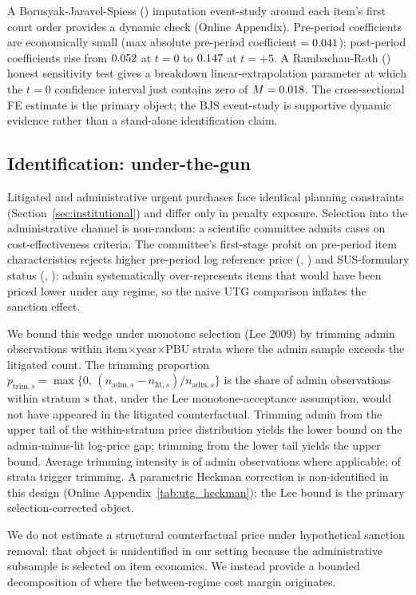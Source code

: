 A Borusyak-Jaravel-Spiess (\citeyear{borusyak2024revisiting})
imputation event-study around each item's first court order
provides a dynamic check (Online Appendix). Pre-period coefficients
are economically small (max absolute pre-period coefficient
$=0.041$); post-period coefficients rise from
$0.052$ at $t=0$ to $0.147$ at $t=+5$. A
Rambachan-Roth (\citeyear{rambachan2023more}) honest sensitivity
test gives a breakdown linear-extrapolation parameter at which the
$t=0$ confidence interval just contains zero of
$M=0.018$. The cross-sectional FE estimate is the primary
object; the BJS event-study is supportive dynamic evidence rather
than a stand-alone identification claim.

\subsection{Identification: under-the-gun}

Litigated and administrative urgent purchases face identical planning
constraints (Section~\ref{sec:institutional}) and differ only in
penalty exposure. Selection into the administrative channel is
non-random: a scientific committee admits cases on
cost-effectiveness criteria. The committee's first-stage probit on
pre-period item characteristics rejects higher pre-period log
reference price (\BPutgProbitRefPriceCoef,
\BPutgProbitRefPricePval) and SUS-formulary status
(\BPutgProbitSUSCoef, \BPutgProbitSUSPval): admin systematically
over-represents items that would have been priced lower under any
regime, so the naive UTG comparison inflates the sanction effect.

We bound this wedge under monotone selection (Lee 2009) by trimming
admin observations within item$\times$year$\times$PBU strata where
the admin sample exceeds the litigated count. The trimming
proportion
$p_{\text{trim},s} = \max\{0,\,(n_{\text{adm},s}-n_{\text{lit},s})/n_{\text{adm},s}\}$
is the share of admin observations within stratum $s$ that, under
the Lee monotone-acceptance assumption, would not have appeared in
the litigated counterfactual. Trimming admin from the upper tail of
the within-stratum price distribution yields the lower bound on the
admin-minus-lit log-price gap; trimming from the lower tail yields
the upper bound. Average trimming intensity is \BPutgLeeTrimMean{}
of admin observations where applicable; \BPutgLeeStrataExcess{} of
\BPutgLeeStrataTotal{} strata trigger trimming. A parametric
Heckman correction is non-identified in this design (Online
Appendix~\ref{tab:utg_heckman}); the Lee bound is the primary
selection-corrected object.

We do not estimate a structural counterfactual price under
hypothetical sanction removal: that object is unidentified in our
setting because the administrative subsample is selected on item
economics. We instead provide a bounded decomposition of where the
between-regime cost margin originates.
